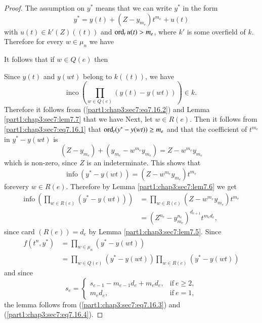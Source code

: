 \begin{proof}
  The assumption on $y^*$ means that we can write $y^*$ in the form
$$
y^* = y(t) + (Z- y_{m_e})t^{m_e} + u(t)
$$
with $u(t) \in k' (Z) ((t))$ and $\operatorname{ord}_t u(t) > m_e$, where $k'$ is some overfield of $k$. Therefore for every $w \in \mu_n$ we have

It follows that if $w \in Q(e)$ then 

Since $y(t)$ and $y (wt)$ belong to $k((t))$, we have
$$
\text{inco}~ \left(\prod_{w \in Q (e)} (y (t) - y(wt)) \right) \in k.
$$
Therefore it follows from (\ref{part1:chap3:sec7:eq7.16.2}) and Lemma \ref{part1:chap3:sec7:lem7.7} that we have
Next, let $w \in R(e)$. Then it follows from \ref{part1:chap3:sec7:eq7.16.1} that $\operatorname{ord}_t (y^* - y (wt)) \geq m_e$ and that the coefficient of $t^{m_e}$ in $y^*- y(wt)$ is 
$$
(Z - y_{m_e}) + (y_{m_e}- w^{m_e} y_{m_e}) = Z- w^{m_e} y_{m_e}
$$
which is non-zero, since $Z$ is an indeterminate. This shows that
$$
\text{info}~ (y^* - y(wt))= (Z- w^{m_e} y_{m_e})t^{m_e}
$$ 
for\pageoriginale every $w \in R(e)$. Therefore by Lemma \ref{part1:chap3:sec7:lem7.6} we get
\begin{align*}
  \text{info}~ \left(\prod_{w \in R(e)} (y^* - y(wt))\right) & = \prod_{w \in R(e)} (Z - w^{m_e} y_{m_e}) t^{m_e}\\
  & = (Z^{n_e} - y_{m_e}^{n_e})^{d_{e+1}} t^{m_e d_e},\tag{7.16.4}
\label{part1:chap3:sec7:eq7.16.4}
\end{align*}
since card $(R(e))= d_e$ by Lemma \ref{part1:chap3:sec7:lem7.5}. Since
\begin{align*}
  f(t^n, y^*) & = \prod_{w \in \mu_n} (y^*- y(wt))\\
  & = \prod_{w \in Q (e)} (y^* - y (wt)) \prod_{w \in R(e)} (y^* - y(wt))
\end{align*}
and since
$$
s_e =
\begin{cases}
  s_{e-1} -m_{e-1} d_e+ m_e d_e, & \text{if}~ e\geq 2,\\
  m_e d_e, & \text{if}~ e=1,
\end{cases}
$$
the lemma follows from (\ref{part1:chap3:sec7:eq7.16.3}) and 
(\ref{part1:chap3:sec7:eq7.16.4}).
\end{proof}

